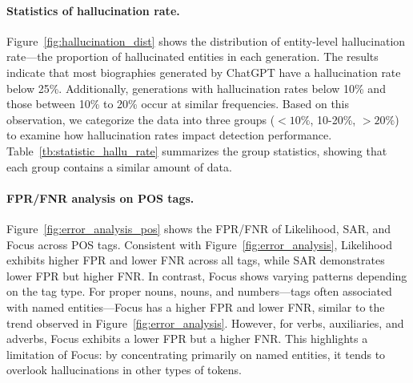 \paragraph{Statistics of hallucination rate.}

Figure~\ref{fig:hallucination_dist} shows the distribution of entity-level hallucination rate---the proportion of hallucinated entities in each generation. The results indicate that most biographies generated by ChatGPT have a hallucination rate below 25\%. Additionally, generations with hallucination rates below 10\% and those between 10\% to 20\% occur at similar frequencies. Based on this observation, we categorize the data into three groups ($<10\%$, 10-20\%, $>20\%$) to examine how hallucination rates impact detection performance. Table~\ref{tb:statistic_hallu_rate} summarizes the group statistics, showing that each group contains a similar amount of data.





\paragraph{FPR/FNR analysis on POS tags.} Figure~\ref{fig:error_analysis_pos} shows the FPR/FNR of Likelihood, SAR, and Focus across POS tags. Consistent with Figure~\ref{fig:error_analysis}, Likelihood exhibits higher FPR and lower FNR across all tags, while SAR demonstrates lower FPR but higher FNR. In contrast, Focus shows varying patterns depending on the tag type. For proper nouns, nouns, and numbers---tags often associated with named entities---Focus has a higher FPR and lower FNR, similar to the trend observed in Figure~\ref{fig:error_analysis}. However, for verbs, auxiliaries, and adverbs, Focus exhibits a lower FPR but a higher FNR. This highlights a limitation of Focus: by concentrating primarily on named entities, it tends to overlook hallucinations in other types of tokens.












